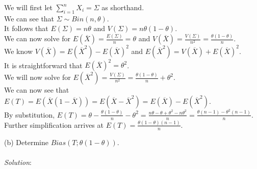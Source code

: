 \documentclass[12pt]{article}
\begin{document}
\noindent
We will first let $ \displaystyle \sum_{i=1}^{n} X_{i} = \Sigma $ as shorthand. \\

\noindent
We can see that $ \displaystyle \Sigma \sim Bin(n, \theta) $. \\

\noindent
It follows that $ E(\Sigma) = n\theta $ and $ V(\Sigma) = n\theta(1 - \theta) $. \\

\noindent
We can now solve for $ \displaystyle E(\overline{X}) = \frac{E(\Sigma)}{n} = \theta $ and $ \displaystyle V(\overline{X}) = \frac{V(\Sigma)}{n^2} = \frac{\theta(1 - \theta)}{n} $. \\

\noindent
We know $ V(\overline{X}) = E(\overline{X}^{2}) - E(\overline{X})^{2} $ and $ E(\overline{X}^{2}) = V(\overline{X}) + E(\overline{X})^{2} $. \\

\noindent
It is straightforward that $ E(\overline{X})^{2} = \theta^{2} $. \\

\noindent
We will now solve for $ \displaystyle E(\overline{X}^{2}) = \frac{V(\Sigma)}{n^2} = \frac{\theta(1 - \theta)}{n} + \theta^{2} $. \\

\noindent
We can now see that $ E(T) = E(\overline{X}(1 - \overline{X})) = E(\overline{X} - \overline{X}^{2}) = E(\overline{X}) - E(\overline{X}^2) $. \\

\noindent
By substitution, $ \displaystyle E(T) = \theta - \frac{\theta(1 - \theta)}{n} - \theta^{2} = \frac{n\theta - \theta + \theta^{2} - n\theta^{2}}{n} = \frac{\theta(n - 1) - \theta^{2}(n - 1)}{n} $. \\

\noindent
Further simplification arrives at $ \displaystyle E(T) = \frac{\theta(1 - \theta)(n - 1)}{n} $. \\
\newpage


(b) Determine $ Bias(T; \theta(1 - \theta)) $. \\
\vspace{2.5mm} \\
\textit{Solution}:
\vspace{2.5mm} \\
\end{document}
